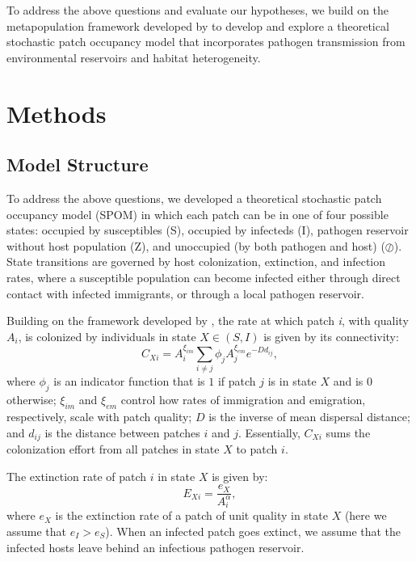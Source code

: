 \documentclass{svjour3}
\begin{document}
To address the above questions and evaluate our hypotheses, we build on the metapopulation framework developed by \cite{Hanski1994} to develop and explore a theoretical stochastic patch occupancy model that incorporates pathogen transmission from environmental reservoirs and habitat heterogeneity.   

\section{Methods}
\label{methods}

\subsection{Model Structure}
To address the above questions, we developed a theoretical stochastic patch occupancy model (SPOM) in which each patch can be in one of four possible states: occupied by susceptibles (S), occupied by infecteds (I), pathogen reservoir without host population (Z), and unoccupied (by both pathogen and host) ($\oslash$).  State transitions are governed by host colonization, extinction, and infection rates, where a susceptible population can become infected either through direct contact with infected immigrants, or through a local pathogen reservoir.  

Building on the framework developed by \cite{Hanski1994}, the rate at which patch \emph{i}, with quality $A_i$, is colonized by individuals in state $X \in (S,I)$ is given by its connectivity:
\begin{equation}
C_{Xi}=A_i^{\xi_{im}} \sum_{i\neq j }\phi_jA_j^{\xi_{em}}e^{-D d_{ij}},
\end{equation}
where $\phi_j$ is an indicator function that is $1$ if patch $j$ is in state $X$ and is $0$ otherwise; $\xi_{im}$ and $\xi_{em}$ control how rates of immigration and emigration, respectively, scale with patch quality; $D$ is the inverse of mean dispersal distance; and $d_{ij}$ is the distance between patches $i$ and $j$.  Essentially, $C_{Xi}$ sums the colonization effort from all patches in state $X$ to patch $i$.  

The extinction rate of patch $i$ in state $X$ is given by:
\begin{equation}
E_{Xi}=\frac{e_X}{A_i^\alpha},
\end{equation}
where $e_X$ is the extinction rate of a patch of unit quality in state $X$ (here we assume that $e_I>e_S$).  When an infected patch goes extinct, we assume that the infected hosts leave behind an infectious pathogen reservoir.  
\end{document}

